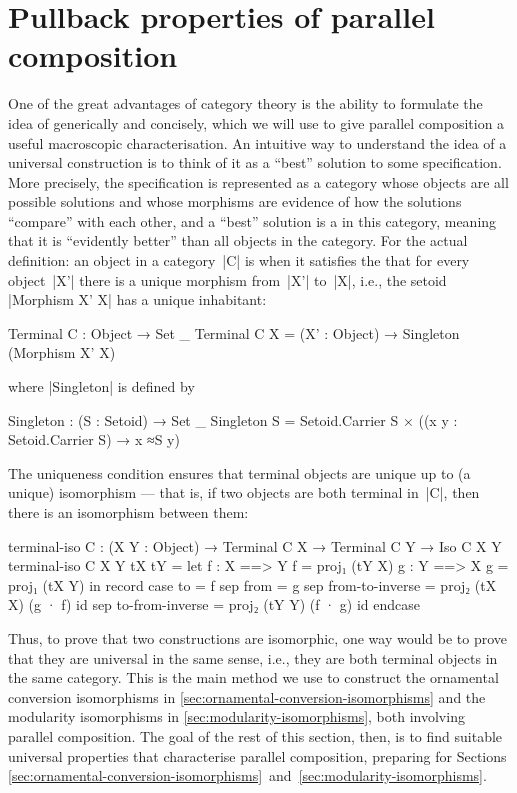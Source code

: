 
\section{Pullback properties of parallel composition}
\label{sec:parallel-composition-pullback}

One of the great advantages of category theory is the ability to formulate the idea of  generically and concisely, which we will use to give parallel composition a useful macroscopic characterisation.
An intuitive way to understand the idea of a universal construction is to think of it as a ``best'' solution to some specification.
More precisely, the specification is represented as a category whose objects are all possible solutions and whose morphisms are evidence of how the solutions ``compare'' with each other, and a ``best'' solution is a  in this category, meaning that it is ``evidently better'' than all objects in the category.
For the actual definition: an object in a category~|C| is  when it satisfies the  that for every object~|X'| there is a unique morphism from~|X'| to~|X|, i.e., the setoid |Morphism X' X| has a unique inhabitant:
\begin{code}
Terminal C : Object → Set _
Terminal C X = (X' : Object) → Singleton (Morphism X' X)
\end{code}
where |Singleton| is defined by
\begin{code}
Singleton : (S : Setoid) → Set _
Singleton S = Setoid.Carrier S × ((x y : Setoid.Carrier S) → x ≈S y)
\end{code}
The uniqueness condition ensures that terminal objects are unique up to (a unique) isomorphism --- that is, if two objects are both terminal in~|C|, then there is an isomorphism between them:
\begin{code}
terminal-iso C : (X Y : Object) → Terminal C X → Terminal C Y → Iso C X Y
terminal-iso C X Y tX tY =
  let  f : X ==> Y
       f = proj₁ (tY  X)
       g : Y ==> X
       g = proj₁ (tX  Y)
  in   record  case  to    = f
               sep   from  = g
               sep   from-to-inverse  = proj₂ (tX  X)  (g · f) id
               sep   to-from-inverse  = proj₂ (tY  Y)  (f · g) id endcase
\end{code}
Thus, to prove that two constructions are isomorphic, one way would be to prove that they are universal in the same sense, i.e., they are both terminal objects in the same category.
This is the main method we use to construct the ornamental conversion isomorphisms in \autoref{sec:ornamental-conversion-isomorphisms} and the modularity isomorphisms in \autoref{sec:modularity-isomorphisms}, both involving parallel composition.
The goal of the rest of this section, then, is to find suitable universal properties that characterise parallel composition, preparing for Sections \ref{sec:ornamental-conversion-isomorphisms}~and~\ref{sec:modularity-isomorphisms}.


